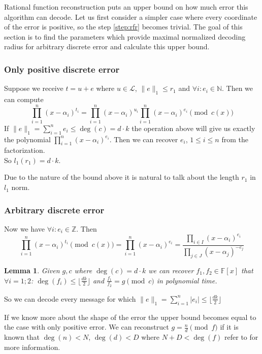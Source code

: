 \documentclass[12pt]{article}
\newcommand{\floor}[1]{\lfloor #1 \rfloor}
\newtheorem{lemma}{Lemma}
\begin{document}
Rational function reconstruction puts an upper bound on how much error this algorithm can decode. Let us first consider a simpler case where every coordinate of the error is positive, so the step \ref{step:rfr} becomes trivial. The goal of this section is to find the parameters which provide maximal normalized decoding radius for arbitrary discrete error and calculate this upper bound.

\subsubsection{Only positive discrete error}
\label{subsubsec:positive_error}
Suppose we receive $t = u + e$ where $u \in \mathcal{L}$, $\|e\|_1 \leq r_1$ and $\forall i: e_i \in \mathbb{N}$. Then we can compute
\[
\prod_{i = 1}^{n}(x - \alpha_i)^{t_i} = \prod_{i = 1}^{n}(x - \alpha_i)^{u_i}\prod_{i = 1}^{n}(x - \alpha_i)^{e_i} \pmod{c(x)}
\]
If $\|e\|_1 = \sum_{i =1}^{n} e_i \leq \deg(c) = d \cdot k$ the operation above will give us exactly the polynomial $\prod_{i = 1}^{n}(x - \alpha_i)^{e_i}$. Then we can recover $e_i$, $1 \leq i \leq n$ from the factorization.\\
So $l_1(r_1) = d \cdot k$.

Due to the nature of the bound above it is natural to talk about the length $r_1$ in $l_1$ norm.


\subsubsection{Arbitrary discrete error}
\label{subsubsec:discrete_error}
Now we have $\forall i: e_i \in \mathbb{Z}$. Then
\[
\prod_{i = 1}^{n}(x - \alpha_i)^{t_i} \pmod{c(x)} = \prod_{i = 1}^{n}(x - \alpha_i)^{e_i} = \frac{\prod_{i \in I}(x - \alpha_i)^{e_i}}{\prod_{j \in J}(x - \alpha_j)^{-e_j}}
\]

\begin{lemma}
Given $g,c$ where $\deg(c) = d \cdot k$ we can recover $f_{1}, f_{2} \in \mathbb{F}[x]$ that  $\forall i = 1;2$: $\deg(f_{i}) \leq \floor{\frac{dk}{2}}$ and $\frac{f_{1}}{f_{2}} = g \pmod{c}$ in polynomial time.
\end{lemma}

So we can decode every message for which $\|e\|_1 = \sum_{i =1}^{n} |e_i| \leq \floor{\frac{dk}{2}}$

If we know more about the shape of the error the upper bound becomes equal to the case with only positive error. We can reconstruct $g = \frac{n}{d} \pmod{f}$ if it is known that $\deg(n) < N$, $\deg(d) < D$ where $N + D < \deg(f)$ refer to \cite{[KM06]} for more information.
\end{document}
